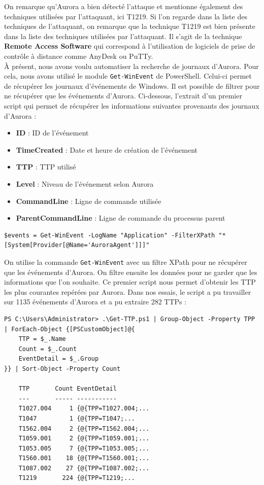 \documentclass[12pt,letterpaper]{article}
\begin{document}
On remarque qu'Aurora a bien détecté l'attaque et mentionne également des techniques utilisées par l'attaquant, ici T1219.
Si l'on regarde dans la liste des techniques de l'attaquant, on remarque que la technique T1219 est bien présente dans la liste des techniques utilisées par l'attaquant.
Il s'agit de la technique \textbf{Remote Access Software} qui correspond à l'utilisation de logiciels de prise de contrôle à distance comme AnyDesk ou PuTTy. \\

À présent, nous avons voulu automatiser la recherche de journaux d'Aurora. Pour cela, nous avons utilisé le module \verb|Get-WinEvent| de PowerShell.
Celui-ci permet de récupérer les journaux d'événements de Windows. Il est possible de filtrer pour ne récupérer que les événements d'Aurora.
Ci-dessous, l'extrait d'un premier script qui permet de récupérer les informations suivantes provenants des journaux d'Aurora :
\begin{itemize}
    \item \textbf{ID} : ID de l'événement
    \item \textbf{TimeCreated} : Date et heure de création de l'événement
    \item \textbf{TTP} : TTP utilisé
    \item \textbf{Level} : Niveau de l'événement selon Aurora
    \item \textbf{CommandLine} : Ligne de commande utilisée
    \item \textbf{ParentCommandLine} : Ligne de commande du processus parent
\end{itemize}

\begin{lstlisting}[caption={Récupération des journaux d'Aurora}, label={lst:aurora_logs}]
$events = Get-WinEvent -LogName "Application" -FilterXPath "*[System[Provider[@Name='AuroraAgent']]]"
\end{lstlisting}

On utilise la commande \verb|Get-WinEvent| avec un filtre XPath pour ne récupérer que les événements d'Aurora. 
On filtre ensuite les données pour ne garder que les informations que l'on souhaite.
Ce premier script nous permet d'obtenir les TTP les plus courantes repérées par Aurora.
Dans nos essais, le script a pu travailler sur 1135 événements d'Aurora et a pu extraire 282 TTPs :

\begin{lstlisting}[caption={Recherche des TTP dans les journaux d'Aurora}, label={lst:ttp_logs}]
PS C:\Users\Administrator> .\Get-TTP.ps1 | Group-Object -Property TPP | ForEach-Object {[PSCustomObject]@{
    TTP = $_.Name
    Count = $_.Count
    EventDetail = $_.Group
}} | Sort-Object -Property Count

    TTP       Count EventDetail
    ---       ----- -----------
    T1027.004     1 {@{TPP=T1027.004;...
    T1047         1 {@{TPP=T1047;...
    T1562.004     2 {@{TPP=T1562.004;...
    T1059.001     2 {@{TPP=T1059.001;...
    T1053.005     7 {@{TPP=T1053.005;...
    T1560.001    18 {@{TPP=T1560.001;...
    T1087.002    27 {@{TPP=T1087.002;...
    T1219       224 {@{TPP=T1219;...
\end{lstlisting}
\end{document}
